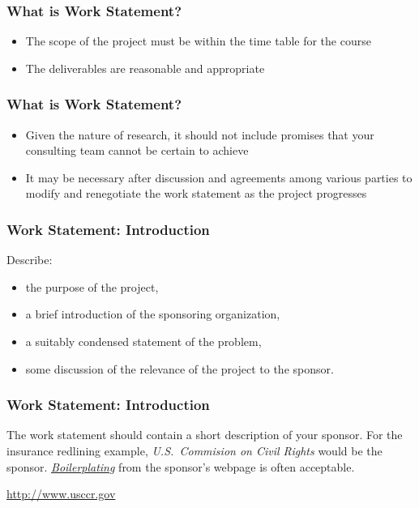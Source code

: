 \documentclass[hyperref={colorlinks=false},compress,handout,10pt]{beamer}
\let\olditem\item
\renewcommand{\item}{\setlength{\itemsep}{0.5\baselineskip}\olditem}
\begin{document}
\begin{frame}
    \frametitle{What is Work Statement?}
    \begin{itemize}
        \item The scope of the project must be within the time table for the
            course
            \vspace{1cm}
        \item The deliverables are reasonable and appropriate
    \end{itemize}
\end{frame}

\begin{frame}
    \frametitle{What is Work Statement?}
    \begin{itemize}
        \item Given the nature of research, it should not include promises
            that your consulting team cannot be certain to achieve
            \vspace{1cm}
        \item It may be necessary after discussion and agreements among
            various parties to modify and renegotiate the work statement as 
            the project progresses
    \end{itemize}
\end{frame}

\begin{frame}
    \frametitle{Work Statement: Introduction}
    Describe:
    \begin{itemize}
        \item the purpose of the project,
        \item a brief introduction of the sponsoring organization,
        \item a suitably condensed statement of the problem,
        \item some discussion of the relevance of the project to the sponsor.
    \end{itemize}
\end{frame}

\begin{frame}[fragile]
    \frametitle{Work Statement: Introduction}
    The work statement should contain a short description 
    of your sponsor.  
    \vskip0.2in
    For the insurance redlining example, 
    \emph{U.S.~Commision on Civil Rights} would be the sponsor.
    \vskip0.2in
    \href{http://en.wikipedia.org/wiki/Boilerplate_%28text%29}{\emph{Boilerplating}} from the sponsor's webpage is often acceptable. 
    \vskip0.5in
    \begin{center}
        \href{http://www.usccr.gov/about/}{http://www.usccr.gov}
    \end{center}
\end{frame}
\end{document}
